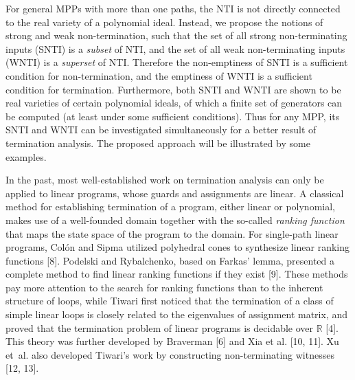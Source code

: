 \documentclass{article}
\def\dsee#1{\vskip 0.3cm \noindent{\bf #1} \vskip 0.2cm}
\begin{document}
For general MPPs with more than one paths, the NTI is not directly connected to the real variety of a polynomial ideal. Instead, we propose the notions of strong and weak non-termination, such that the set of all strong non-terminating inputs (SNTI) is a \emph{subset} of NTI, and the set of all weak non-terminating inputs (WNTI) is a \emph{superset} of NTI. Therefore the non-emptiness of SNTI is a sufficient condition for non-termination, and the emptiness of WNTI is a sufficient condition for termination. Furthermore, both SNTI and WNTI are shown to be real varieties of certain polynomial ideals, of which a finite set of generators can be computed (at least under some sufficient conditions). Thus for any MPP, its SNTI and WNTI can be investigated simultaneously for a better result of termination analysis. The proposed approach will be illustrated by some examples.

\dsee{1.1~~Related work}
In the past, most well-established work on termination analysis can only be applied to linear programs, whose guards and assignments are linear. A classical method for establishing termination of a program, either linear or polynomial, makes use of a well-founded domain together with the so-called \emph{ranking function} that maps the state space of the program to the domain. For single-path linear programs, Col\'{o}n and Sipma utilized polyhedral cones to synthesize linear ranking functions [8]. Podelski and Rybalchenko, based on Farkas' lemma, presented a complete method to find linear ranking functions if they exist [9]. These methods pay more attention to the search for ranking functions than to the inherent structure of loops, while Tiwari first noticed that the termination of a class of simple linear loops is closely related to the eigenvalues of assignment matrix, and proved that the termination problem of linear programs is decidable over $\mathbb{R}$ [4]. This theory was further developed by Braverman [6] and Xia et al. [10, 11]. Xu et~al. also developed Tiwari's work by constructing non-terminating witnesses [12, 13].
\end{document}
